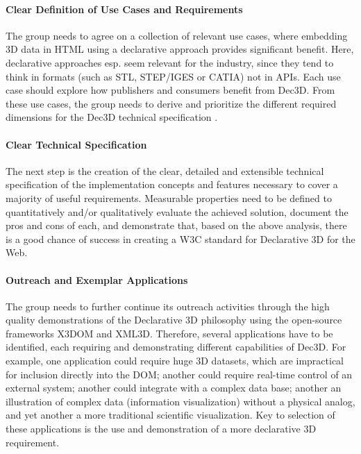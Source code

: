 \documentclass{acmsiggraph}
\begin{document}
\paragraph{Clear Definition of Use Cases and Requirements}
The group needs to agree on a collection of relevant use cases, where embedding 3D data in HTML using a declarative approach provides significant benefit. Here, declarative approaches esp. seem relevant for the industry, since they tend to think in formats (such as STL, STEP/IGES or CATIA) not in APIs.
Each use case should explore how publishers and consumers benefit from Dec3D. From these use cases, the group needs to derive and prioritize the different required dimensions for the Dec3D technical specification \cite{JankowskiDec3D2012,LeFeuvreDec3D2012}.
\vspace{-0.1cm}

\paragraph{Clear Technical Specification}
The next step is the creation of the clear, detailed and extensible technical specification of the implementation concepts and features necessary to cover a majority of useful requirements. Measurable properties need to be defined to quantitatively and/or qualitatively evaluate the achieved solution, document the pros and cons of each, and demonstrate that, based on the above analysis, there is a good chance of success in creating a W3C standard for Declarative 3D for the Web.
\vspace{-0.1cm}

\paragraph{Outreach and Exemplar Applications}
The group needs to further continue its outreach activities through the high quality demonstrations of the Declarative 3D philosophy using the open-source frameworks X3DOM and XML3D. Therefore, several applications have to be identified, each requiring and demonstrating different capabilities of Dec3D. For example, one application could require huge 3D datasets, which are impractical for inclusion directly into the DOM; another could require real-time control of an external system; another could integrate with a complex data base; another an illustration of complex data (information visualization) without a physical analog, and yet another a more traditional scientific visualization. Key to selection of these applications is the use and demonstration of a more declarative 3D requirement.
\end{document}
